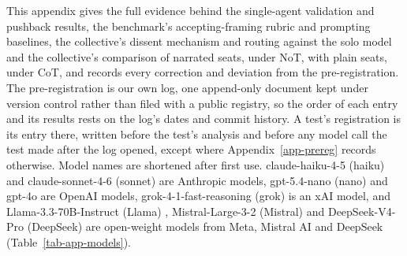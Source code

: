 This appendix gives the full evidence behind the single-agent validation and
pushback results, the benchmark's accepting-framing rubric and prompting
baselines, the collective's dissent mechanism and routing against the
solo model and the collective's comparison of narrated seats, under NoT, with
plain seats, under CoT, and records every correction and deviation from the
pre-registration.
The pre-registration is our own log, one append-only document kept under
version control rather than filed with a public registry, so the order of
each entry and its results rests on the log's dates and commit history. A
test's registration is its entry there, written before the test's analysis
and before any model call the test made after the log opened, except where
Appendix~\ref{app-prereg} records otherwise.
Model names are shortened after first use. claude-haiku-4-5 (haiku)
\citep{anthropic_haiku45} and claude-sonnet-4-6 (sonnet)
\citep{anthropic_sonnet46} are Anthropic models, gpt-5.4-nano (nano)
\citep{openai_gpt54nano} and gpt-4o \citep{openai_gpt4o,openai_gpt4o_systemcard}
are OpenAI models, grok-4-1-fast-reasoning
(grok) \citep{xai_grok41} is an xAI model, and Llama-3.3-70B-Instruct (Llama)
\citep{meta_llama33}, Mistral-Large-3-2 (Mistral) \citep{mistral_large3} and
DeepSeek-V4-Pro (DeepSeek) \citep{deepseek_v4pro,deepseek_v4_report} are
open-weight models from Meta, Mistral AI and DeepSeek
(Table~\ref{tab-app-models}).
